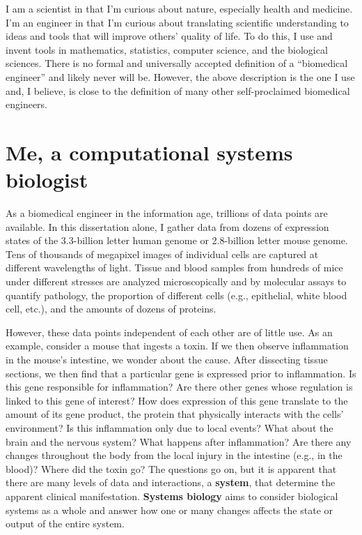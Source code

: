 I am a scientist in that I’m curious about nature, especially 
health and medicine. I’m an engineer in that I’m curious 
about translating scientific understanding to ideas and 
tools that will improve others' quality of life. To do 
this, I use and invent tools in mathematics, statistics, 
computer science, and the biological sciences. There is 
no formal and universally accepted definition of a 
``biomedical engineer'' and likely never will be. However, 
the above description is the one I use and, I believe, is
close to the definition of many other self-proclaimed 
biomedical engineers.

\section{Me, a computational systems biologist}

As a biomedical engineer in the information age, trillions of 
data points are available. In this dissertation alone, I gather 
data from dozens of expression states of the 3.3-billion 
letter human genome or 2.8-billion letter mouse genome. Tens 
of thousands of megapixel images of individual cells are 
captured at different wavelengths of light. Tissue and blood 
samples from hundreds of mice under different stresses are 
analyzed microscopically and by molecular assays to quantify 
pathology, the proportion of different cells (e.g., epithelial, 
white blood cell, etc.), and the amounts of dozens of proteins. 

However, these data points independent of each other are of little 
use. As an example, consider a mouse that ingests a toxin. If we then observe 
inflammation in the mouse’s intestine, we wonder about the cause.
After dissecting tissue sections, we then find that a particular 
gene is expressed prior to inflammation. Is this gene responsible for 
inflammation? Are there other genes whose regulation is 
linked to this gene of interest? How does expression 
of this gene translate to the amount of its gene product, 
the protein that physically interacts with the cells’ 
environment? Is this inflammation only due to local 
events? What about the brain and the nervous system? What 
happens after inflammation? Are there any changes throughout 
the body from the local injury in the intestine (e.g., in 
the blood)? Where did the toxin go? The questions go on, 
but it is apparent that there are many levels of data and 
interactions, a \textbf{system}, that determine the apparent 
clinical manifestation. \textbf{Systems biology} aims 
to consider biological systems as a whole and answer how 
one or many changes affects the state or output of the 
entire system.

